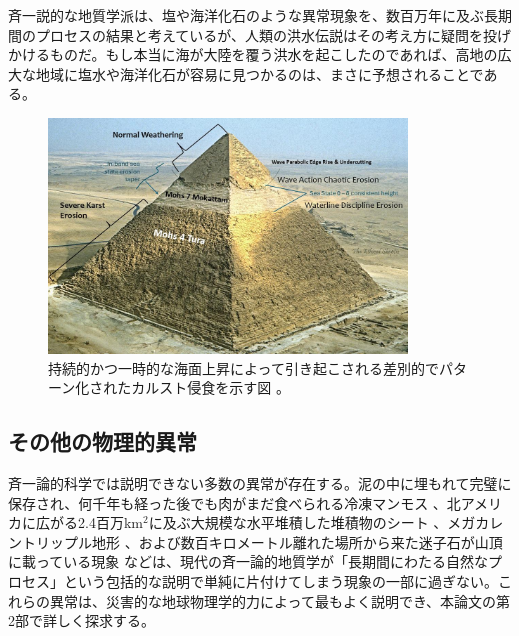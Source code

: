\documentclass[10pt,twocolumn,letterpaper]{article}
\begin{document}
斉一説的な地質学派は、塩や海洋化石のような異常現象を、数百万年に及ぶ長期間のプロセスの結果と考えているが、人類の洪水伝説はその考え方に疑問を投げかけるものだ。もし本当に海が大陸を覆う洪水を起こしたのであれば、高地の広大な地域に塩水や海洋化石が容易に見つかるのは、まさに予想されることである。



\begin{figure}[t]
\begin{center}
\includegraphics[width=0.85\textwidth]{khafre.jpg}
\end{center}
   \caption{持続的かつ一時的な海面上昇によって引き起こされる差別的でパターン化されたカルスト侵食を示す図 \cite{27}。}
\label{fig:4}
\end{figure}

\subsection{その他の物理的異常}

斉一論的科学では説明できない多数の異常が存在する。泥の中に埋もれて完璧に保存され、何千年も経った後でも肉がまだ食べられる冷凍マンモス \cite{17,18,19}、北アメリカに広がる2.4百万km$^2$に及ぶ大規模な水平堆積した堆積物のシート \cite{21}、メガカレントリップル地形 \cite{22}、および数百キロメートル離れた場所から来た迷子石が山頂に載っている現象 \cite{23,26} などは、現代の斉一論的地質学が「長期間にわたる自然なプロセス」という包括的な説明で単純に片付けてしまう現象の一部に過ぎない。これらの異常は、災害的な地球物理学的力によって最もよく説明でき、本論文の第2部で詳しく探求する。
\end{document}
